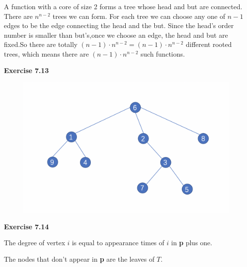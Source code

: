\documentclass{article} %
\begin{document}
A function with a core of size 2 forms a tree whose head and but are connected. There are $n^{n-2}$ trees we can form. For each tree we can choose any one of $n-1$ edges to be the edge connecting the head and the but. Since the head's order number is smaller than but's,once we choose an edge, the head and but are fixed.So there are totally $(n-1) \cdot n^{n-2}=(n-1)\cdot n^{n-2}$ different rooted trees, which means there are $(n-1)\cdot n^{n-2}$ such functions.\par

    	\textbf{Exercise 7.13}\par
  	\begin{figure}[H]
  	\centering
  	\includegraphics[scale=0.6]{713.png}
  	\caption{}
  	\label{}
  	\end{figure}
	
	\textbf{Exercise 7.14}\par
	The degree of vertex $i$ is equal to appearance times of $i$ in \textbf{p} plus one.\par
	The nodes that don't appear in \textbf{p} are the leaves of $T$.\par
	
\end{document}
